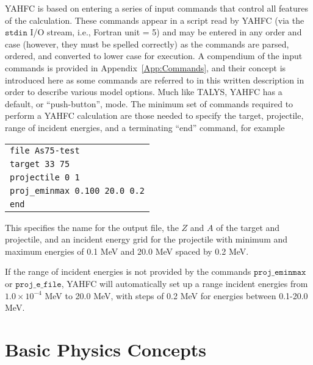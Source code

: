 \documentclass[
10pt,
showpacs,preprintnumbers,footinbib,
amsfonts,amsmath,amssymb,
aps,
prc,twocolumn,groupedaddress,superscriptaddress,
showkeys,
nofootinbib
]{revtex4-1}
\begin{document}
YAHFC is based on entering a series of input commands that control all features of the calculation. These commands appear in a script read by YAHFC (via the ${\texttt{stdin}}$ I/O stream, i.e., Fortran unit = 5) and may be entered in any order and case (however, they must be spelled correctly) as the commands are parsed, ordered, and converted to lower case for execution. A compendium of the input commands is provided in Appendix~\ref{App:Commands}, and their concept is introduced here as some commands are referred to in this written description in order to describe various model options.  Much like TALYS, YAHFC has a default, or ``push-button'', mode. The minimum set of commands required to perform a YAHFC calculation are those needed to specify the target, projectile, range of incident energies, and a terminating ``end'' command, for example
\begin{center}
\begin{tabular}{| p{7 cm}|}
\hline
{\texttt {file As75-test}}\\
{\texttt {target 33 75}} \\
{\texttt {projectile 0 1}}\\
{\texttt {proj\_eminmax   0.100   20.0  0.2}}\\
{\texttt {end}}\\
\hline
\end{tabular}
\end{center}
This specifies the name for the output file, the $Z$ and $A$ of the target and projectile, and an incident energy grid for the projectile with minimum and maximum energies of 0.1 MeV and 20.0 MeV spaced by 0.2 MeV. 

If the range of incident energies is not provided by the commands ${\texttt{proj\_eminmax}}$ or ${\texttt{proj\_e\_file}}$, YAHFC will automatically set up a range incident energies from $1.0\times 10^{-4}$ MeV to 20.0 MeV, with steps of 0.2 MeV for energies between 0.1-20.0 MeV.
  
\section{Basic Physics Concepts}
\end{document}
